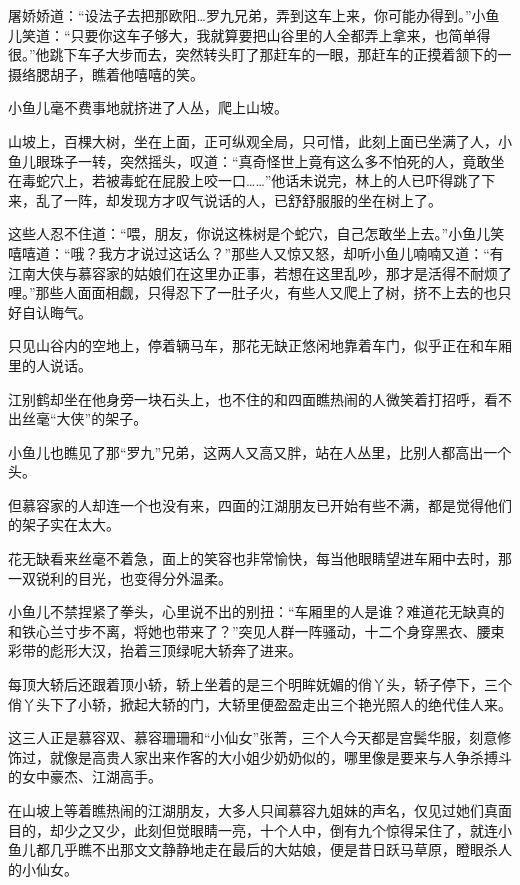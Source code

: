 \documentclass[12pt,oneside]{book}
\begin{document}
屠娇娇道：``设法子去把那欧阳\ldots 罗九兄弟，弄到这车上来，你可能办得到。''小鱼儿笑道：``只要你这车子够大，我就算要把山谷里的人全都弄上拿来，也简单得很。''他跳下车子大步而去，突然转头盯了那赶车的一眼，那赶车的正摸着颔下的一摄络腮胡子，瞧着他嘻嘻的笑。

小鱼儿毫不费事地就挤进了人丛，爬上山坡。

山坡上，百棵大树，坐在上面，正可纵观全局，只可惜，此刻上面已坐满了人，小鱼儿眼珠子一转，突然摇头，叹道：``真奇怪世上竟有这么多不怕死的人，竟敢坐在毒蛇穴上，若被毒蛇在屁股上咬一口\ldots\ldots{}''他话未说完，林上的人已吓得跳了下来，乱了一阵，却发现方才叹气说话的人，已舒舒服服的坐在树上了。

这些人忍不住道：``喂，朋友，你说这株树是个蛇穴，自己怎敢坐上去。''小鱼儿笑嘻嘻道：``哦？我方才说过这话么？''那些人又惊又怒，却听小鱼儿喃喃又道：``有江南大侠与慕容家的姑娘们在这里办正事，若想在这里乱吵，那才是活得不耐烦了哩。''那些人面面相觑，只得忍下了一肚子火，有些人又爬上了树，挤不上去的也只好自认晦气。

只见山谷内的空地上，停着辆马车，那花无缺正悠闲地靠着车门，似乎正在和车厢里的人说话。

江别鹤却坐在他身旁一块石头上，也不住的和四面瞧热闹的人微笑着打招呼，看不出丝毫``大侠''的架子。

小鱼儿也瞧见了那``罗九''兄弟，这两人又高又胖，站在人丛里，比别人都高出一个头。

但慕容家的人却连一个也没有来，四面的江湖朋友已开始有些不满，都是觉得他们的架子实在太大。

花无缺看来丝毫不着急，面上的笑容也非常愉快，每当他眼睛望进车厢中去时，那一双锐利的目光，也变得分外温柔。

小鱼儿不禁捏紧了拳头，心里说不出的别扭：``车厢里的人是谁？难道花无缺真的和铁心兰寸步不离，将她也带来了？''突见人群一阵骚动，十二个身穿黑衣、腰束彩带的彪形大汉，抬着三顶绿呢大轿奔了进来。

每顶大轿后还跟着顶小轿，轿上坐着的是三个明眸妩媚的俏丫头，轿子停下，三个俏丫头下了小轿，掀起大轿的门，大轿里便盈盈走出三个艳光照人的绝代佳人来。

这三人正是慕容双、慕容珊珊和``小仙女''张菁，三个人今天都是宫鬓华服，刻意修饰过，就像是高贵人家出来作客的大小姐少奶奶似的，哪里像是要来与人争杀搏斗的女中豪杰、江湖高手。

在山坡上等着瞧热闹的江湖朋友，大多人只闻慕容九姐妹的声名，仅见过她们真面目的，却少之又少，此刻但觉眼睛一亮，十个人中，倒有九个惊得呆住了，就连小鱼儿都几乎瞧不出那文文静静地走在最后的大姑娘，便是昔日跃马草原，瞪眼杀人的小仙女。
\end{document}
